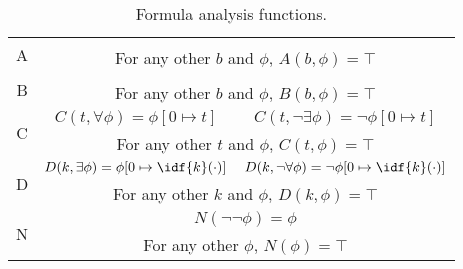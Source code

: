 \begin{table}
  \centering
  \begin{tabular}{|c|cc|}
    \hline
    \multirow{2}{*}{A} &  &  \\ \cline{2-3} 
                       & \multicolumn{2}{c|}{For any other $b$ and $\phi$, $A(b,\phi) = \top$} \\ \hline
    \multirow{2}{*}{B} &  &  \\ \cline{2-3} 
                       & \multicolumn{2}{c|}{For any other $b$ and $\phi$, $B(b,\phi) = \top$} \\ \hline
    \multirow{2}{*}{C} & $C(t, \forall \phi) = \phi [0 \mapsto t]$ & $C(t, \lnot \exists \phi) = \lnot \phi [0 \mapsto t]$ \\ \cline{2-3} 
                       & \multicolumn{2}{c|}{For any other $t$ and $\phi$, $C(t,\phi) = \top$} \\ \hline
    \multirow{2}{*}{D} & $D(k, \exists \phi) = \phi [0 \mapsto \idf{k}(\cdot)]$ & $D(k, \lnot \forall \phi) = \lnot \phi [0 \mapsto \idf{k}(\cdot)]$ \\ \cline{2-3} 
                       & \multicolumn{2}{c|}{For any other $k$ and $\phi$, $D(k,\phi) = \top$} \\ \hline
    \multirow{2}{*}{N} & \multicolumn{2}{c|}{$N(\lnot \lnot \phi) = \phi$} \\ \cline{2-3} 
                       & \multicolumn{2}{c|}{For any other $\phi$, $N(\phi) = \top$} \\ \hline
  \end{tabular}
  \caption{Formula analysis functions.}
  \label{tab:analysis}
\end{table}